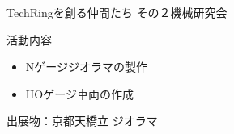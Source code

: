 \documentclass[dvipdfmx]{beamer}
\begin{document}
\begin{frame}{TechRingを創る仲間たち その２}{機械研究会}

  \vspace{-2mm}
  
  \begin{minipage}{0.85\textwidth}
    \begin{block}{活動内容}
      \begin{itemize}
        \item Nゲージジオラマの製作
        \item HOゲージ車両の作成
      \end{itemize}
    \end{block}
  \end{minipage}

  \vspace{3mm}

  出展物：\alert{京都天橋立 ジオラマ}


\end{frame}
\end{document}

